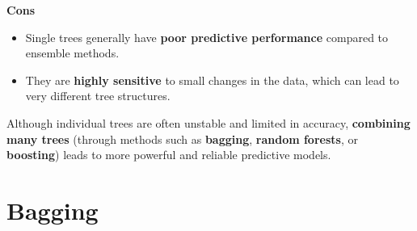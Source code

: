 \documentclass[
  letterpaper,
  DIV=11,
  numbers=noendperiod]{scrartcl}
\providecommand{\tightlist}{%
  \setlength{\itemsep}{0pt}\setlength{\parskip}{0pt}}\usepackage{longtable,booktabs,array}
\begin{document}
\textbf{Cons}

\begin{itemize}
\tightlist
\item
  Single trees generally have \textbf{poor predictive performance}
  compared to ensemble methods.
\item
  They are \textbf{highly sensitive} to small changes in the data, which
  can lead to very different tree structures.
\end{itemize}

Although individual trees are often unstable and limited in accuracy,
\textbf{combining many trees} (through methods such as \textbf{bagging},
\textbf{random forests}, or \textbf{boosting}) leads to more powerful
and reliable predictive models.

\section{Bagging}\label{bagging}

\section{}\label{section}
\end{document}
